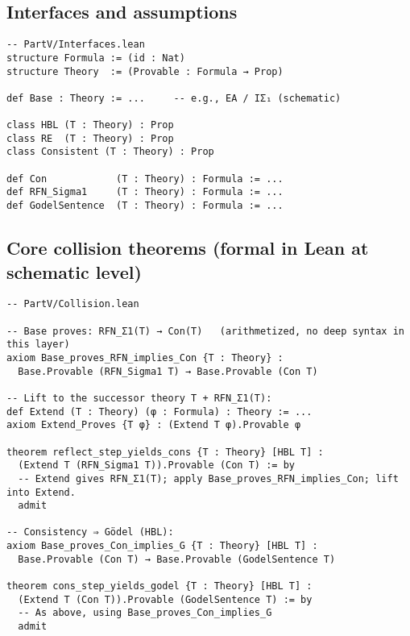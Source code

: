 \documentclass[11pt]{article}
\theoremstyle{definition}
\theoremstyle{remark}
\begin{document}
\subsection*{Interfaces and assumptions}
\begin{verbatim}
-- PartV/Interfaces.lean
structure Formula := (id : Nat)
structure Theory  := (Provable : Formula → Prop)

def Base : Theory := ...     -- e.g., EA / IΣ₁ (schematic)

class HBL (T : Theory) : Prop
class RE  (T : Theory) : Prop
class Consistent (T : Theory) : Prop

def Con            (T : Theory) : Formula := ...
def RFN_Sigma1     (T : Theory) : Formula := ...
def GodelSentence  (T : Theory) : Formula := ...
\end{verbatim}

\subsection*{Core collision theorems (formal in Lean at schematic level)}
\begin{verbatim}
-- PartV/Collision.lean

-- Base proves: RFN_Σ1(T) → Con(T)   (arithmetized, no deep syntax in this layer)
axiom Base_proves_RFN_implies_Con {T : Theory} :
  Base.Provable (RFN_Sigma1 T) → Base.Provable (Con T)

-- Lift to the successor theory T + RFN_Σ1(T):
def Extend (T : Theory) (φ : Formula) : Theory := ...
axiom Extend_Proves {T φ} : (Extend T φ).Provable φ

theorem reflect_step_yields_cons {T : Theory} [HBL T] :
  (Extend T (RFN_Sigma1 T)).Provable (Con T) := by
  -- Extend gives RFN_Σ1(T); apply Base_proves_RFN_implies_Con; lift into Extend.
  admit

-- Consistency ⇒ Gödel (HBL):
axiom Base_proves_Con_implies_G {T : Theory} [HBL T] :
  Base.Provable (Con T) → Base.Provable (GodelSentence T)

theorem cons_step_yields_godel {T : Theory} [HBL T] :
  (Extend T (Con T)).Provable (GodelSentence T) := by
  -- As above, using Base_proves_Con_implies_G
  admit
\end{verbatim}
\end{document}
